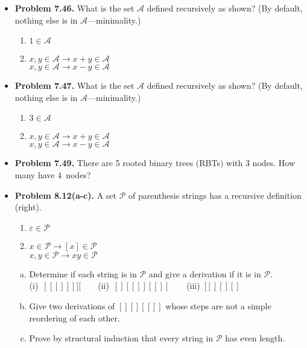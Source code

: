 \documentclass[11pt]{article}
\def\imp{\rightarrow}
\begin{document}
\begin{itemize}
\vspace{0.1in}

\item \textbf{Problem 7.46.}
What is the set $\mathcal{A}$ defined recursively as shown?
(By default, nothing else is in $\mathcal{A}$---minimality.)
\begin{enumerate}[(1)]
\item $1\in\mathcal{A}$
\item $x,y\in\mathcal{A}\imp x+y\in\mathcal{A}$ \\
  $x,y\in\mathcal{A}\imp x-y\in\mathcal{A}$
\end{enumerate}

\vspace{0.1in}

\item \textbf{Problem 7.47.}
What is the set $\mathcal{A}$ defined recursively as shown?
(By default, nothing else is in $\mathcal{A}$---minimality.)
\begin{enumerate}[(1)]
\item $3\in\mathcal{A}$
\item $x,y\in\mathcal{A}\imp x+y\in\mathcal{A}$ \\
  $x,y\in\mathcal{A}\imp x-y\in\mathcal{A}$
\end{enumerate}

\vspace{0.1in}

\item \textbf{Problem 7.49.}
There are 5 rooted binary trees (RBTs) with 3 nodes.
How many have 4~nodes?

\vspace{0.1in}

\item \textbf{Problem 8.12(a-c).}
A set $\mathcal{P}$ of parenthesis strings has a recursive definition (right).
\begin{enumerate}[(1)]
\item $\varepsilon\in\mathcal{P}$
\item $x\in\mathcal{P}\imp [x]\in\mathcal{P}$ \\
  $x,y\in\mathcal{P}\imp xy\in\mathcal{P}$
\end{enumerate}
\begin{enumerate}[(a)]
\item Determine if each string is in $\mathcal{P}$ and
  give a derivation if it is in $\mathcal{P}$. \\
  (i)~$[[[]]]][$\ \ \ \ (ii)~$[][[]][[]]$\ \ \ \ (iii)~$[[][][]$
\item Give two derivations of $[][][[]]$ whose steps are not a simple reordering of each other.
\item Prove by structural induction that every string in $\mathcal{P}$ has even length.
\end{enumerate}


\end{itemize}
\end{document}
